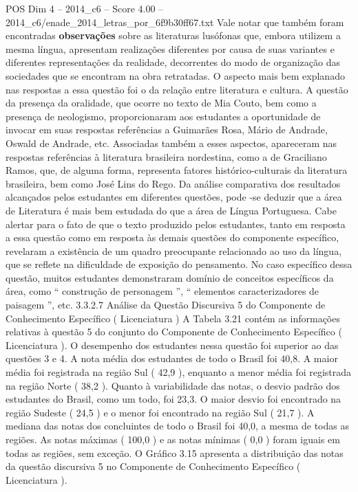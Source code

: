 \begin{textsample}{POS Dim 4 – 2014\_c6 – Score 4.00 – 2014\_c6/enade\_2014\_letras\_por\_6f9b30ff67.txt}
Vale notar que também foram encontradas \textbf{observações} sobre as literaturas lusófonas que, embora utilizem a mesma língua, apresentam realizações diferentes por causa de suas variantes e diferentes representações da realidade, decorrentes do modo de organização das sociedades que se encontram na obra retratadas.
O aspecto mais bem explanado nas respostas a essa questão foi o da relação entre literatura e cultura.
A questão da presença da oralidade, que ocorre no texto de Mia Couto, bem como a presença de neologismo, proporcionaram aos estudantes a oportunidade de invocar em suas respostas referências a Guimarães Rosa, Mário de Andrade, Oswald de Andrade, etc.
Associadas também a esses aspectos, apareceram nas respostas referências à literatura brasileira nordestina, como a de Graciliano Ramos, que, de alguma forma, representa fatores histórico-culturais da literatura brasileira, bem como José Lins do Rego.
Da análise comparativa dos resultados alcançados pelos estudantes em diferentes questões, pode -se deduzir que a área de Literatura é mais bem estudada do que a área de Língua Portuguesa.
Cabe alertar para o fato de que o texto produzido pelos estudantes, tanto em resposta a essa questão como em resposta às demais questões do componente específico, revelaram a existência de um quadro preocupante relacionado ao uso da língua, que se reflete na dificuldade de exposição do pensamento.
No caso específico dessa questão, muitos estudantes demonstraram domínio de conceitos específicos da área, como “ construção de personagem ”, “ elementos caracterizadores de paisagem ”, etc. 3.3.2.7 Análise da Questão Discursiva 5 do Componente de Conhecimento Específico ( Licenciatura ) A Tabela 3.21 contém as informações relativas à questão 5 do conjunto do Componente de Conhecimento Específico ( Licenciatura ).
O desempenho dos estudantes nessa questão foi superior ao das questões 3 e 4.
A nota média dos estudantes de todo o Brasil foi 40,8.
A maior média foi registrada na região Sul ( 42,9 ), enquanto a menor média foi registrada na região Norte ( 38,2 ).
Quanto à variabilidade das notas, o desvio padrão dos estudantes do Brasil, como um todo, foi 23,3.
O maior desvio foi encontrado na região Sudeste ( 24,5 ) e o menor foi encontrado na região Sul ( 21,7 ).
A mediana das notas dos concluintes de todo o Brasil foi 40,0, a mesma de todas as regiões.
As notas máximas ( 100,0 ) e as notas mínimas ( 0,0 ) foram iguais em todas as regiões, sem exceção.
O Gráfico 3.15 apresenta a distribuição das notas da questão discursiva 5 no Componente de Conhecimento Específico ( Licenciatura ).

\end{textsample}
